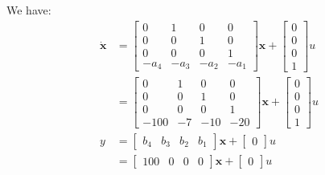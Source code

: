 We have:
\begin{equation}
    \begin{aligned}
        \dot{\textbf{x}} &=
        \begin{bmatrix}
            0    & 1    & 0    & 0\\
            0    & 0    & 1    & 0\\
            0    & 0    & 0    & 1\\
            -a_4 & -a_3 & -a_2 & -a_1
        \end{bmatrix}
        \textbf{x} + 
        \begin{bmatrix}
            0 \\ 0 \\ 0 \\ 1
        \end{bmatrix}
        u \\ &=
        \begin{bmatrix}
            0    & 1    & 0    & 0\\
            0    & 0    & 1    & 0\\
            0    & 0    & 0    & 1\\
            -100 & -7   & -10  & -20
        \end{bmatrix}
        \textbf{x} + 
        \begin{bmatrix}
            0 \\ 0 \\ 0 \\ 1
        \end{bmatrix}
        u \\
        y &=
        \begin{bmatrix}
            b_4 & b_3 & b_2 & b_1
        \end{bmatrix}
        \textbf{x} + 
        \begin{bmatrix}
            0
        \end{bmatrix}
        u \\ &=
        \begin{bmatrix}
            100 & 0 & 0 & 0
        \end{bmatrix}
        \textbf{x} + 
        \begin{bmatrix}
            0
        \end{bmatrix}
        u
    \end{aligned}
\end{equation}

